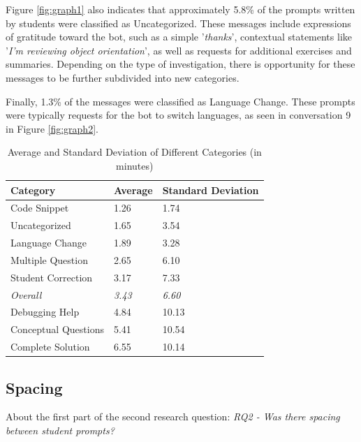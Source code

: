 \documentclass[a4paper,twoside]{article}
\begin{document}
Figure \ref{fig:graph1} also indicates that approximately 5.8\% of the prompts
written by students were classified as Uncategorized. These messages include
expressions of gratitude toward the bot, such as a simple '\textit{thanks}',
contextual statements like '\textit{I'm reviewing object orientation}', as well
as requests for additional exercises and summaries. Depending on the type of
investigation, there is opportunity for these messages to be further subdivided
into new categories.

Finally, 1.3\% of the messages were classified as Language Change. These prompts
were typically requests for the bot to switch languages, as seen in conversation
9 in Figure \ref{fig:graph2}.

\begin{table}[htbp]
  \caption{Average and Standard Deviation of Different Categories (in minutes)}
  \begin{center}
    \renewcommand{\arraystretch}{1.6} %
    \begin{tabular}{p{4cm} p{4cm} p{4cm}} %
      \hline
      \textbf{Category} & \textbf{Average} & \textbf{Standard Deviation} \\
      \hline
      Code Snippet & 1.26 & 1.74 \\
      Uncategorized & 1.65 & 3.54 \\
      Language Change & 1.89 & 3.28 \\
      Multiple Question & 2.65 & 6.10 \\
      Student Correction & 3.17 & 7.33 \\
      \hdashline
      \textit{Overall} & \textit{3.43} & \textit{6.60} \\
      \hdashline
      Debugging Help & 4.84 & 10.13 \\
      Conceptual Questions & 5.41 & 10.54 \\
      Complete Solution & 6.55 & 10.14 \\
      \hline
    \end{tabular}
    \label{tab:averages}
  \end{center}
\end{table}

\subsection{Spacing}

About the first part of the second research question: \textit{RQ2 - Was there
spacing between student prompts?}
\end{document}
